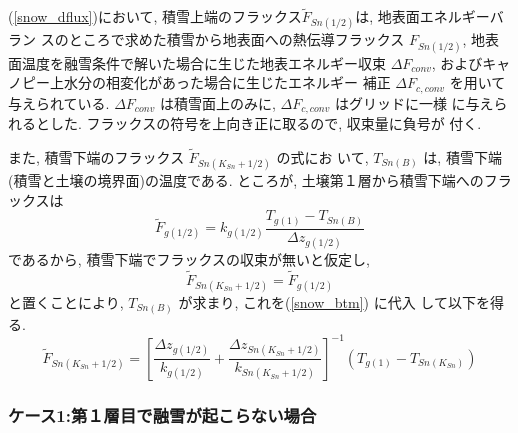 (\ref{snow_dflux})において,
積雪上端のフラックス$ \widetilde{F}_{Sn(1/2)}$は, 地表面エネルギーバラン
スのところで求めた積雪から地表面への熱伝導フラックス $F_{Sn(1/2)}$, 地表
面温度を融雪条件で解いた場合に生じた地表エネルギー収束 $\Delta
F_{conv}$, およびキャノピー上水分の相変化があった場合に生じたエネルギー
補正 $\Delta F_{c,conv}$ を用いて与えられている. 
$\Delta F_{conv}$ は積雪面上のみに, $\Delta F_{c,conv}$ はグリッドに一様
に与えられるとした. フラックスの符号を上向き正に取るので, 収束量に負号が
付く. 

また, 積雪下端のフラックス $\widetilde{F}_{Sn(K_{Sn}+1/2)}$ の式にお
いて, $T_{Sn(B)}$ は, 積雪下端(積雪と土壌の境界面)の温度である. 
ところが, 土壌第１層から積雪下端へのフラックスは
\begin{equation}
\widetilde{F}_{g(1/2)} = k_{g(1/2)} \frac{T_{g(1)}-T_{Sn(B)}}{\Delta z_{g(1/2)}}
\end{equation}
であるから, 積雪下端でフラックスの収束が無いと仮定し, 
\begin{equation}
\widetilde{F}_{Sn(K_{Sn}+1/2)} =  \widetilde{F}_{g(1/2)}
\end{equation}
と置くことにより, $T_{Sn(B)}$ が求まり, これを(\ref{snow_btm}) に代入
して以下を得る. 
\begin{equation}
\widetilde{F}_{Sn(K_{Sn}+1/2)} = 
\left[\frac{\Delta z_{g(1/2)}}{k_{g(1/2)}}
+\frac{\Delta z_{Sn(K_{Sn}+1/2)}}{k_{Sn(K_{Sn}+1/2)}}
\right]^{-1}
(T_{g(1)} - T_{Sn(K_{Sn})})
\label{snow_btm}
\end{equation}

\subsubsection{ケース1:第１層目で融雪が起こらない場合}


